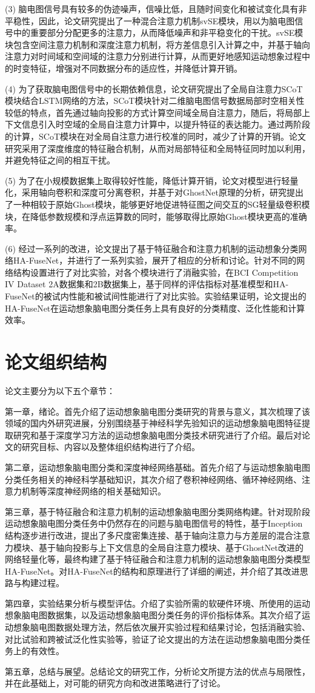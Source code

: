 (3) 脑电图信号具有较多的伪迹噪声，信噪比低，且随时间变化和被试变化具有非平稳性，因此，论文研究提出了一种混合注意力机制svSE模块，用以为脑电图信号中的重要部分分配更多的注意力，从而降低噪声和非平稳变化的干扰。svSE模块包含空间注意力机制和深度注意力机制，将方差信息引入计算之中，并基于轴向注意力对时间域和空间域的注意力分别进行计算，从而更好地感知运动想象过程中的时变特征，增强对不同数据分布的适应性，并降低计算开销。

(4) 为了获取脑电图信号中的长期依赖信息，论文研究提出了全局自注意力SCoT模块结合LSTM网络的方法，SCoT模块针对二维脑电图信号数据局部时空相关性较低的特点，首先通过轴向投影的方式计算空间域全局自注意力，随后，将局部上下文信息引入时空域的全局自注意力计算中，以提升特征的表达能力。通过两阶段的计算，SCoT模块在对全局自注意力进行校准的同时，减少了计算的开销。论文研究采用了深度维度的特征融合机制，从而对局部特征和全局特征同时加以利用，并避免特征之间的相互干扰。

(5) 为了在小规模数据集上取得较好性能，降低计算开销，论文对模型进行轻量化，采用轴向卷积和深度可分离卷积，并基于对GhostNet原理的分析，研究提出了一种相较于原始Ghost模块，能够更好地促进特征图之间交互的SG轻量级卷积模块，在降低参数规模和浮点运算数的同时，能够取得比原始Ghost模块更高的准确率。

(6) 经过一系列的改进，论文提出了基于特征融合和注意力机制的运动想象分类网络HA-FuseNet，并进行了一系列实验，展开了相应的分析和讨论。针对不同的网络结构设置进行了对比实验，对各个模块进行了消融实验，在BCI Competition IV Dataset 2A数据集和2B数据集上，基于同样的评估指标对基准模型和HA-FuseNet的被试内性能和被试间性能进行了对比实验。实验结果证明，论文提出的HA-FuseNet在运动想象脑电图分类任务上具有良好的分类精度、泛化性能和计算效率。

\section{论文组织结构}

论文主要分为以下五个章节：

第一章，绪论。首先介绍了运动想象脑电图分类研究的背景与意义，其次梳理了该领域的国内外研究进展，分别围绕基于神经科学先验知识的运动想象脑电图特征提取研究和基于深度学习方法的运动想象脑电图分类技术研究进行了介绍。最后对论文的研究目标、内容以及整体组织结构进行了介绍。

第二章，运动想象脑电图分类和深度神经网络基础。首先介绍了与运动想象脑电图分类任务相关的神经科学基础知识，其次介绍了卷积神经网络、循环神经网络、注意力机制等深度神经网络的相关基础知识。

第三章，基于特征融合和注意力机制的运动想象脑电图分类网络构建。针对现阶段运动想象脑电图分类任务中仍然存在的问题与脑电图信号的特性，基于Inception结构逐步进行改进，提出了多尺度密集连接、基于轴向注意力与方差层的混合注意力模块、基于轴向投影与上下文信息的全局自注意力模块、基于GhostNet改进的网络轻量化等，最终构建了基于特征融合和注意力机制的运动想象脑电图分类模型HA-FuseNet。对HA-FuseNet的结构和原理进行了详细的阐述，并介绍了其改进思路与构建过程。

第四章，实验结果分析与模型评估。介绍了实验所需的软硬件环境、所使用的运动想象脑电图数据集，以及运动想象脑电图分类任务的评价指标体系。其次介绍了运动想象脑电图数据处理方法，然后依次展开实验过程和结果讨论，包括消融实验、对比试验和跨被试泛化性实验等，验证了论文提出的方法在运动想象脑电图分类任务上的有效性。

第五章，总结与展望。总结论文的研究工作，分析论文所提方法的优点与局限性，并在此基础上，对可能的研究方向和改进策略进行了讨论。